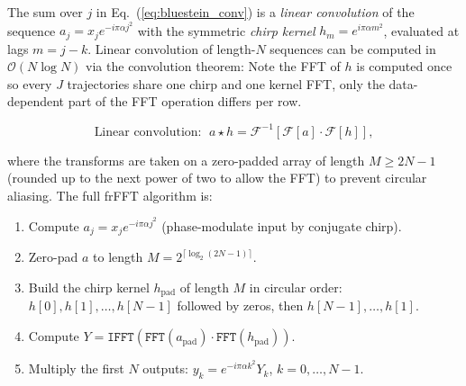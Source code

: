 The sum over $j$ in Eq.~(\ref{eq:bluestein_conv}) is a \textit{linear convolution} of the sequence $a_j = x_j e^{-i\pi\alpha j^2}$ with the symmetric \textit{chirp kernel} $h_m = e^{i\pi\alpha m^2}$, evaluated at lags $m = j - k$. Linear convolution of length-$N$ sequences can be computed in $\mathcal{O}(N\log N)$ via the convolution theorem:
Note the FFT of $h$ is computed once so every $J$ trajectories
share one chirp and one kernel FFT, only the data-dependent part of the FFT 
operation differs per row.

\begin{equation}
    \text{Linear convolution: }\; a \star h = \mathcal{F}^{-1}\!\left[\mathcal{F}[a]\cdot\mathcal{F}[h]\right],
    \label{eq:conv_theorem}
\end{equation}

where the transforms are taken on a zero-padded array of length $M \geq 2N - 1$ (rounded up to the next power of two to allow the FFT) to prevent circular aliasing. The full frFFT algorithm is:

\begin{enumerate}
    \item Compute $a_j = x_j e^{-i\pi\alpha j^2}$ (phase-modulate input by conjugate chirp).
    \item Zero-pad $a$ to length $M = 2^{\lceil\log_2(2N-1)\rceil}$.
    \item Build the chirp kernel $h_{\text{pad}}$ of length $M$ in circular order: $h[0], h[1], \ldots, h[N-1]$ followed by zeros, then $h[N-1], \ldots, h[1]$.
    \item Compute $Y = \texttt{IFFT}(\texttt{FFT}(a_{\text{pad}}) \cdot \texttt{FFT}(h_{\text{pad}}))$.
    \item Multiply the first $N$ outputs: $y_k = e^{-i\pi\alpha k^2} Y_k$, $k = 0, \ldots, N-1$.
\end{enumerate}

